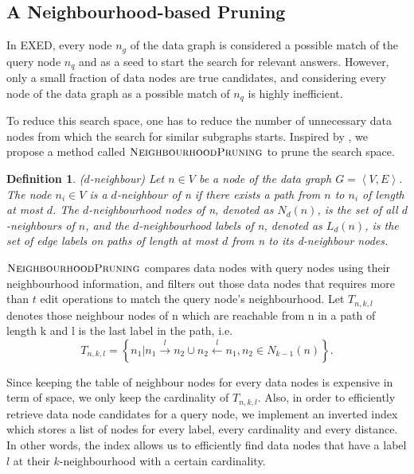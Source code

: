\documentclass{sigmod}
\newtheorem{definition}{Definition}
\begin{document}
\subsection{A Neighbourhood-based Pruning}
In EXED, every node $n_g$ of the data graph is considered a possible match of the query node $n_q$ and as a seed to start the search for relevant answers. However, only a small fraction of data nodes are true candidates, and considering every node of the data graph as a possible match of $n_q$ is highly inefficient.  

To reduce this search space, one has to reduce the number of unnecessary data nodes from which the search for similar subgraphs starts. Inspired by \cite{khan2011neighborhood}, we propose a method called $\textproc{NeighbourhoodPruning}$ to prune the search space.

\begin{definition}{($d$-neighbour)}
\label{d-neighbor}
Let $n \in V$ be a node of the
data graph $G = \left \langle V, E\right\rangle$. The node $n_i \in V$ is a $d$-neighbour
of n if there exists a path from $n$ to $n_i$ of length at
most $d$. The $d$-neighbourhood nodes of n, denoted as $N_d(n)$, is the
set of all $d$-neighbours of $n$, and the $d$-neighbourhood labels of n, denoted as $L_d(n)$, is the
set of edge labels on paths of length at most $d$ from n to its d-neighbour nodes.
\end{definition}

$\textproc{NeighbourhoodPruning}$ compares data nodes with query nodes using their neighbourhood information, and filters out those data nodes that requires more than $t$ edit operations to match the query node's neighbourhood. Let $T_{n, k, l}$ denotes those neighbour nodes of n which are reachable from n in a path of length k and l is the last label in the path, i.e. 
\begin{equation*}
T_{n, k, l} = \left\{n_1 | n_1 \xrightarrow{l} n_2\cup n_2 \xleftarrow{l} n_1, n_2 \in N_{k-1}(n)\right\}.
\end{equation*}

Since keeping the table of neighbour nodes for every data nodes is expensive in term of space, we only keep the cardinality of $T_{n,k,l}$. Also, in order to efficiently retrieve data node candidates for a query node, we implement an inverted index which stores a list of nodes for every label, every cardinality and every distance. In other words, the index allows us to efficiently find data nodes that have a label $l$ at their $k$-neighbourhood with a certain cardinality. 
\end{document}
